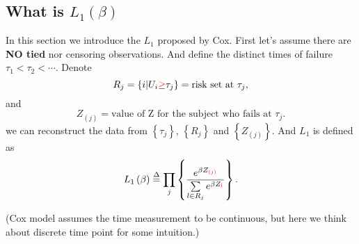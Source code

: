 \documentclass[a4paper,12pt]{article}
\begin{document}
\subsection{What is $L_1\left(\beta\right)$}
\label{sec:what-is}

In this section we introduce the $L_1$ proposed by Cox. First let's assume there are \textbf{NO tied} nor censoring observations. And define the distinct times of failure $\tau_1 < \tau_2 < \cdots$. Denote
\[
  R_j = \left\{i\middle|U_i{\color{red} \geq}\tau_j\right\}
  = \text{risk set at }\tau_j
  ,
\]
and
\[
  Z_{\left(j\right)} = \text{value of Z for the subject who fails at $\tau_j$}
  .
\]
we can reconstruct the data from $\left\{\tau_j\right\}$, $\left\{R_j\right\}$ and $\left\{Z_{\left(j\right)}\right\}$. And $L_1$ is defined as
\begin{equation}
  \label{eq:partial_likelihood}
  L_1\left(\beta\right)
  \overset{\Delta}{=}
  \prod\limits_{j}\left\{
    \frac{e^{\beta Z_{{\color{red}\left(j\right)}}}}{
      \sum\limits_{l\in R_{j}}e^{\beta Z_{{\color{red}l}}}
    }
  \right\}
  .
\end{equation}

{\color{red}(Cox model assumes the time measurement to be continuous, but here we think about discrete time point for some intuition.)} 
\end{document}
